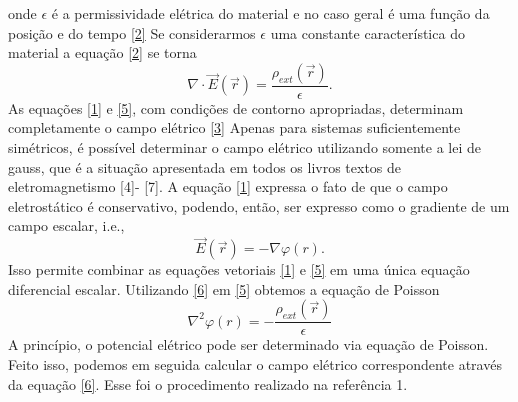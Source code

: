 \documentclass[brazilian,10.7pt,a4paper]{article}
\begin{document}
\begin{multicols}{2}
onde $\epsilon$ é a permissividade elétrica do material e no caso geral é uma função da posição e do tempo \eqref{2} Se considerarmos $\epsilon$ uma constante característica do material a equação \eqref{2} se torna
\begin{equation}\label{5}
\nabla\cdot\vec{E}(\vec{r})=\frac{\rho_{ext}(\vec{r})}{\epsilon} .
\end{equation}
As equações \eqref{1} e \eqref{5}, com condições de contorno apropriadas, determinam completamente o campo elétrico \eqref{3}
Apenas para sistemas suficientemente simétricos, é possível determinar o campo elétrico utilizando somente a lei de gauss, que
é a situação apresentada em todos os livros textos de eletromagnetismo [4]- [7]. A equação \eqref{1} %
expressa o fato de que o campo eletrostático é conservativo, podendo, então, ser expresso como o gradiente de um campo escalar, i.e.,
\begin{equation}\label{6}
\vec{E}(\vec{r})= -\nabla\varphi(r) .
\end{equation}
Isso permite combinar as equações vetoriais \eqref{1} e \eqref{5} em uma única equação diferencial escalar. Utilizando \eqref{6} em \eqref{5} obtemos a equação de Poisson
\begin{equation}\label{7}
\nabla^{2}\varphi(r)=-\frac{\rho_{ext}(\vec{r})}{\epsilon}
\end{equation}
A princípio, o potencial elétrico pode ser determinado via equação de Poisson. Feito isso, podemos em seguida calcular o campo elétrico correspondente através da equação \eqref{6}. Esse foi o procedimento realizado na referência 1.






\end{multicols}
\end{document}
